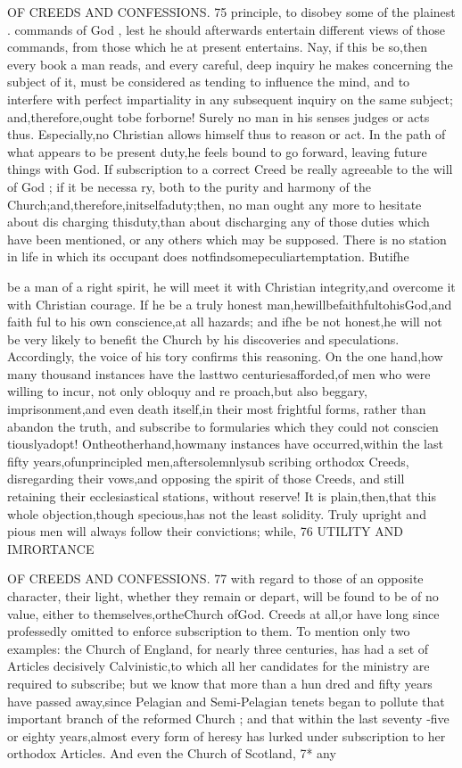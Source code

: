 \documentclass[
]{book}
\begin{document}
OF CREEDS AND CONFESSIONS. 75
principle, to disobey some of the plainest . commands of God , lest he should afterwards entertain different views of those commands, from those which he at present entertains. Nay, if this be so,then every book a man reads, and every careful, deep inquiry he makes concerning the subject of it, must be considered as tending to influence the mind, and to interfere with perfect impartiality in
any subsequent inquiry on the same subject; and,therefore,ought tobe forborne!
Surely no man in his senses judges or acts thus. Especially,no Christian allows himself thus to reason or act. In the path of what
appears to be present duty,he feels bound to
go forward, leaving future things with God.
If subscription to a correct Creed be really
agreeable to the will of God ; if it be necessa
ry, both to the purity and harmony of the
Church;and,therefore,initselfaduty;then,
no man ought any more to hesitate about dis
charging thisduty,than about discharging any
of those duties which have been mentioned,
or any others which may be supposed. There is no station in life in which its occupant does
notfindsomepeculiartemptation. Butifhe

be a man of a right spirit, he will meet it with Christian integrity,and overcome it with
Christian courage. If he be a truly honest man,hewillbefaithfultohisGod,and faith
ful to his own conscience,at all hazards; and ifhe be not honest,he will not be very likely
to benefit the Church by his discoveries and speculations. Accordingly, the voice of his
tory confirms this reasoning. On the one hand,how many thousand instances have the lasttwo centuriesafforded,of men who were willing to incur, not only obloquy and re proach,but also beggary, imprisonment,and even death itself,in their most frightful forms, rather than abandon the truth, and subscribe to formularies which they could not conscien tiouslyadopt! Ontheotherhand,howmany instances have occurred,within the last fifty years,ofunprincipled men,aftersolemnlysub scribing orthodox Creeds, disregarding their vows,and opposing the spirit of those Creeds, and still retaining their ecclesiastical stations, without reserve! It is plain,then,that this whole objection,though specious,has not the
least solidity. Truly upright and pious men will always follow their convictions; while,
76
UTILITY AND IMRORTANCE

OF CREEDS AND CONFESSIONS. 77
with regard to those of an opposite character,
their light, whether they remain or depart, will be found to be of no value, either to themselves,ortheChurch ofGod.
Creeds
at all,or have long since professedly omitted to enforce subscription to them. To mention
only two examples: the Church of England, for nearly three centuries, has had a set of Articles decisively Calvinistic,to which all her candidates for the ministry are required to subscribe; but we know that more than a hun dred and fifty years have passed away,since Pelagian and Semi-Pelagian tenets began to pollute that important branch of the reformed Church ; and that within the last seventy -five or eighty years,almost every form of heresy has lurked under subscription to her orthodox Articles. And even the Church of Scotland,
7*
any
\end{document}
